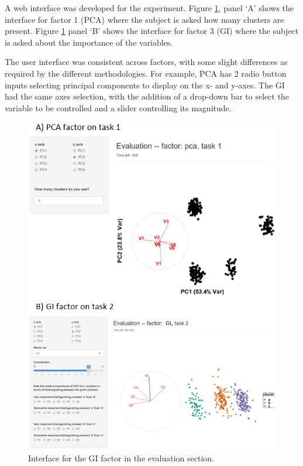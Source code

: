 \documentclass[
  11,
]{article}
\begin{document}
A web interface was developed for the experiment. Figure \ref{fig:appInterface}, panel `A' shows the interface for factor 1 (PCA) where the subject is asked how many clusters are present. Figure \ref{fig:appInterface} panel `B' shows the interface for factor 3 (GI) where the subject is asked about the importance of the variables.

The user interface was consistent across factors, with some slight differences as required by the different methodologies. For example, PCA has 2 radio button inputs selecting principal components to display on the x- and y-axes. The GI had the same axes selection, with the addition of a drop-down bar to select the variable to be controlled and a slider controlling its magnitude.

\begin{figure}[h]

{\centering \includegraphics[width=1\linewidth,]{./figures/appInterface} 

}

\caption{Interface for the GI factor in the evaluation section.}\label{fig:appInterface}
\end{figure}
\end{document}
